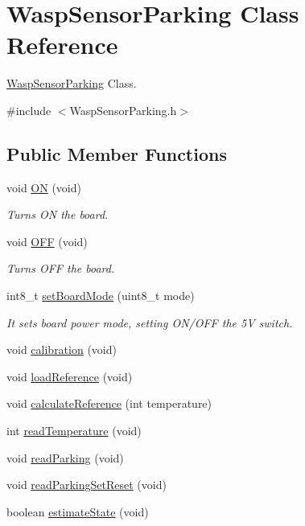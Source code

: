 \hypertarget{class_wasp_sensor_parking}{}\section{Wasp\+Sensor\+Parking Class Reference}
\label{class_wasp_sensor_parking}


\hyperlink{class_wasp_sensor_parking}{Wasp\+Sensor\+Parking} Class.  




{\ttfamily \#include $<$Wasp\+Sensor\+Parking.\+h$>$}

\subsection*{Public Member Functions}
\begin{DoxyCompactItemize}
\item 
void \hyperlink{class_wasp_sensor_parking_a6c056748d5d70090ae6e2f55ae245652}{ON} (void)
\begin{DoxyCompactList}\small\item\em Turns ON the board. \end{DoxyCompactList}\item 
void \hyperlink{class_wasp_sensor_parking_aae248ad64c3da7ee85915a8a535ef688}{O\+FF} (void)
\begin{DoxyCompactList}\small\item\em Turns O\+FF the board. \end{DoxyCompactList}\item 
int8\+\_\+t \hyperlink{class_wasp_sensor_parking_a96d219f6f80b436d2a77da2596fff240}{set\+Board\+Mode} (uint8\+\_\+t mode)
\begin{DoxyCompactList}\small\item\em It sets board power mode, setting O\+N/\+O\+FF the 5V switch. \end{DoxyCompactList}\item 
void \hyperlink{class_wasp_sensor_parking_a8e99b4ddd7a0f18b2b96a9c4de18f914}{calibration} (void)
\item 
void \hyperlink{class_wasp_sensor_parking_ada85f8d26b42a4a6733c0e1d1880a4ad}{load\+Reference} (void)
\item 
void \hyperlink{class_wasp_sensor_parking_a8fe1255a714fed88684a89363963eb02}{calculate\+Reference} (int temperature)
\item 
int \hyperlink{class_wasp_sensor_parking_a8f1e16fed41cb87f3388e33b691e0f97}{read\+Temperature} (void)
\item 
void \hyperlink{class_wasp_sensor_parking_a495a2b26ed6620d327b7cd902696f533}{read\+Parking} (void)
\item 
void \hyperlink{class_wasp_sensor_parking_a8a3311a8d14d5538f2b42cba5c2cc8e0}{read\+Parking\+Set\+Reset} (void)
\item 
boolean \hyperlink{class_wasp_sensor_parking_a5635382fc068370a3b561c94dccbb283}{estimate\+State} (void)
\end{DoxyCompactItemize}
